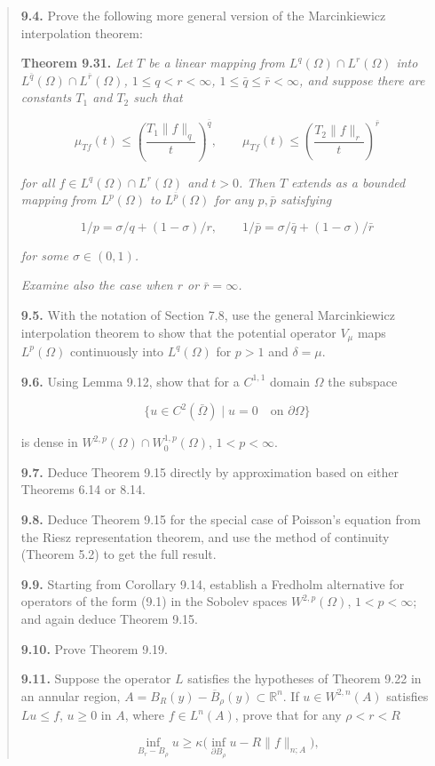 \begin{quote}
\textbf{9.4.} Prove the following more general version of the Marcinkiewicz interpolation theorem:

\textbf{Theorem 9.31.} \emph{Let $T$ be a linear mapping from $L^q(\Omega)\cap L^r(\Omega)$ into $L^{\bar q}(\Omega)\cap L^{\bar r}(\Omega)$, $1\le q<r<\infty$, $1\le \bar q\le \bar r<\infty$, and suppose there are constants $T_1$ and $T_2$ such that}

\[
\mu_{Tf}(t)\le \left(\frac{T_1\lVert f\rVert_q}{t}\right)^{\bar q},
\qquad
\mu_{Tf}(t)\le \left(\frac{T_2\lVert f\rVert_r}{t}\right)^{\bar r}
\tag{9.69}
\]

\emph{for all $f\in L^q(\Omega)\cap L^r(\Omega)$ and $t>0$. Then $T$ extends as a bounded mapping from $L^p(\Omega)$ to $L^{\bar p}(\Omega)$ for any $p,\bar p$ satisfying}

\[
1/p=\sigma/q+(1-\sigma)/r,\qquad 1/\bar p=\sigma/\bar q+(1-\sigma)/\bar r
\]

\emph{for some $\sigma\in(0,1)$.}

\emph{Examine also the case when $r$ or $\bar r=\infty$.}

\textbf{9.5.} With the notation of Section 7.8, use the general Marcinkiewicz interpolation theorem to show that the potential operator $V_\mu$ maps $L^p(\Omega)$ continuously into $L^q(\Omega)$ for $p>1$ and $\delta=\mu$.

\textbf{9.6.} Using Lemma 9.12, show that for a $C^{1,1}$ domain $\Omega$ the subspace

\[
\{u\in C^2(\bar\Omega)\mid u=0\quad \text{on }\partial\Omega\}
\]

is dense in $W^{2,p}(\Omega)\cap W^{1,p}_0(\Omega)$, $1<p<\infty$.

\textbf{9.7.} Deduce Theorem 9.15 directly by approximation based on either Theorems 6.14 or 8.14.

\textbf{9.8.} Deduce Theorem 9.15 for the special case of Poisson's equation from the Riesz representation theorem, and use the method of continuity (Theorem 5.2) to get the full result.

\textbf{9.9.} Starting from Corollary 9.14, establish a Fredholm alternative for operators of the form (9.1) in the Sobolev spaces $W^{2,p}(\Omega)$, $1<p<\infty$; and again deduce Theorem 9.15.

\textbf{9.10.} Prove Theorem 9.19.

\textbf{9.11.} Suppose the operator $L$ satisfies the hypotheses of Theorem 9.22 in an annular region, $A=B_R(y)-\overline{B}_\rho(y)\subset \mathbb{R}^n$. If $u\in W^{2,n}(A)$ satisfies $Lu\le f$, $u\ge 0$ in $A$, where $f\in L^n(A)$, prove that for any $\rho<r<R$

\[
\tag{9.70}
\inf_{B_r-B_\rho}u\ge \kappa\bigl(\inf_{\partial B_\rho}u-R\lVert f\rVert_{n;A}\bigr),
\]
\end{quote}

